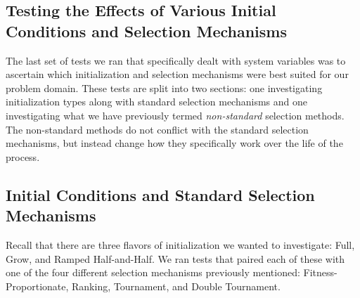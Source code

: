 \documentclass[a4paper,12pt]{report} 	%
\numberwithin{figure}{chapter}
\numberwithin{table}{chapter}
\numberwithin{equation}{chapter}
\begin{document}
\begin{flushleft}
\section{Testing the Effects of Various Initial Conditions and Selection Mechanisms}
The last set of tests we ran that specifically dealt with system variables was to ascertain which initialization and selection mechanisms were best suited for our problem domain. These tests are split into two sections: one investigating initialization types along with standard selection mechanisms and one investigating what we have previously termed \emph{non-standard} selection methods. The non-standard methods do not conflict with the standard selection mechanisms, but instead change how they specifically work over the life of the process.

\subsection{Initial Conditions and Standard Selection Mechanisms}

Recall that there are three flavors of initialization we wanted to investigate: Full, Grow, and Ramped Half-and-Half. We ran tests that paired each of these with one of the four different selection mechanisms previously mentioned: Fitness-Proportionate, Ranking, Tournament, and Double Tournament.


\end{flushleft}
\end{document}
